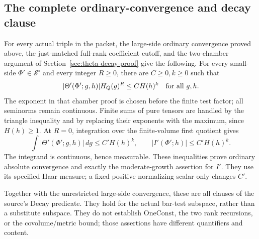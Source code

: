 \subsection{The complete ordinary-convergence and decay clause}
\label{subsec:sr-theta-decay-closed}
For every actual triple in the packet,
the large-side ordinary convergence proved above,
the just-matched full-rank coefficient cutoff, and
the two-chamber argument of
Section~\ref{sec:theta-decay-proof} give the following.
For every small-side \(\Phi'\in\mathcal S^\circ\)
and every integer \(R\ge0\), there are \(C\ge0,k\ge0\)
such that
\[
       |\Theta'(\Phi';g,h)|H_Q(g)^R\le C H(h)^k
                                      \quad\hbox{for all }g,h .
\]
The exponent in that chamber proof is chosen before
the finite test factor; all seminorms remain continuous.
Finite sums of pure tensors are handled by the
triangle inequality and by replacing their exponents
with the maximum, since \(H(h)\ge1\).
At \(R=0\), integration over the finite-volume first
quotient gives
\[
 \int |\Theta'(\Phi';g,h)|\,dg\le C' H(h)^k,\qquad
                  |I'(\Phi';h)|\le C'H(h)^k .
\]
The integrand is continuous, hence measurable.
These inequalities prove ordinary absolute convergence
and exactly the moderate-growth assertion for \(I'\).
They use its specified Haar measure; a fixed positive
normalizing scalar only changes \(C'\).

Together with the unrestricted large-side convergence,
these are all clauses of the source's \(\mathrm{Decay}\)
predicate. They hold for the actual bar-test subspace,
rather than a substitute subspace. They do not
establish \(\mathrm{OneConst}\), the two rank recursions,
or the covolume/metric bound; those assertions have
different quantifiers and content.
